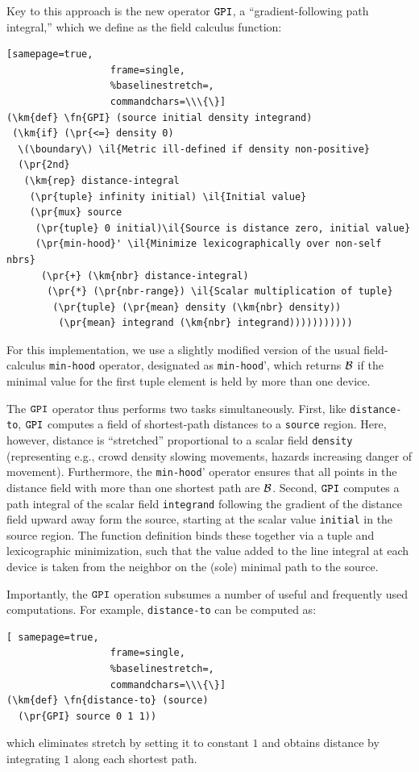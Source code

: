 \documentclass[12pt,a4paper,twoside,openright]{book}
\begin{document}
Key to this approach is the new operator $\texttt{GPI}$, a ``gradient-following path integral,'' which we define as the field calculus function:
\begin{Verbatim}[samepage=true,
                  frame=single,
                  %baselinestretch=,
                  commandchars=\\\{\}]
(\km{def} \fn{GPI} (source initial density integrand)
 (\km{if} (\pr{<=} density 0)
  \(\boundary\) \il{Metric ill-defined if density non-positive}
  (\pr{2nd} 
   (\km{rep} distance-integral
    (\pr{tuple} infinity initial) \il{Initial value}
    (\pr{mux} source 
     (\pr{tuple} 0 initial)\il{Source is distance zero, initial value}
     (\pr{min-hood}' \il{Minimize lexicographically over non-self nbrs}
      (\pr{+} (\km{nbr} distance-integral)
       (\pr{*} (\pr{nbr-range}) \il{Scalar multiplication of tuple}
        (\pr{tuple} (\pr{mean} density (\km{nbr} density))
         (\pr{mean} integrand (\km{nbr} integrand)))))))))))
\end{Verbatim}
For this implementation, we use a slightly modified version of the usual field-calculus {\tt min-hood} operator, designated as {\tt min-hood}', which returns $\mathcal{B}$ if the minimal value for the first tuple element is held by more than one device.

The $\texttt{GPI}$ operator thus performs two tasks simultaneously.  First, like {\tt distance-to}, $\texttt{GPI}$ computes a field of shortest-path distances to a {\tt source} region.
%
Here, however, distance is ``stretched'' proportional to a scalar field {\tt density} (representing e.g., crowd density slowing movements, hazards increasing danger of movement).
%
Furthermore, the {\tt min-hood}' operator ensures that all points in the distance field with more than one shortest path are $\mathcal{B}$.
%
Second, $\texttt{GPI}$ computes a path integral of the scalar field {\tt integrand} following the gradient of the distance field upward away form the source, starting at the scalar value {\tt initial} in the source region.
%
The function definition binds these together via a tuple and lexicographic minimization, such that the value added to the line integral at each device is taken from the neighbor on the (sole) minimal path to the source.

Importantly, the $\texttt{GPI}$ operation subsumes a number of useful and frequently used computations.
%
For example, \texttt{distance-to} can be computed as:
\begin{Verbatim}[ samepage=true,
                  frame=single,
                  %baselinestretch=,
                  commandchars=\\\{\}]
(\km{def} \fn{distance-to} (source)
  (\pr{GPI} source 0 1 1))
\end{Verbatim}
which eliminates stretch by setting it to constant $1$ and obtains distance by integrating $1$ along each shortest path.
\end{document}
